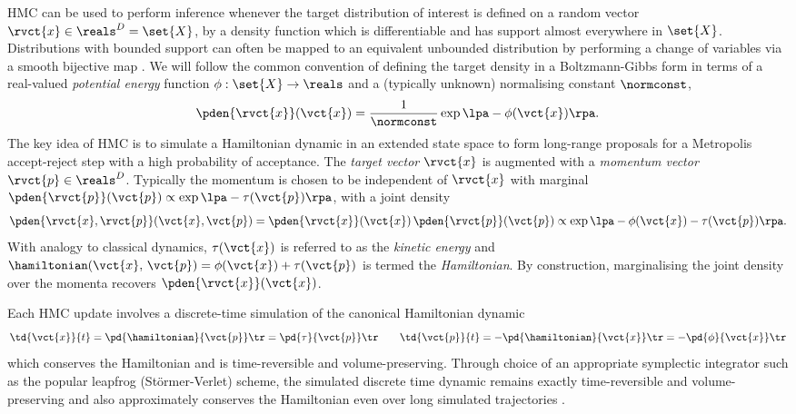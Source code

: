 \ac{HMC} can be used to perform inference whenever the target distribution of interest is defined on a random vector $\rvct{x} \in \reals^D = \set{X}$, by a density function which is differentiable and has support almost everywhere in $\set{X}$. Distributions with bounded support can often be mapped to an equivalent unbounded distribution by performing a change of variables via a smooth bijective map \citep{carpenter2016stan,kucukelbir2016automatic}. We will follow the common convention of defining the target density in a Boltzmann-Gibbs form in terms of a real-valued \emph{potential energy} function $\phi : \set{X} \to \reals$ and a (typically unknown) normalising constant $\normconst$,
\begin{equation}\label{eq:target-density}
  \pden{\rvct{x}}(\vct{x}) = \frac{1}{\normconst}\exp\lpa-\phi(\vct{x})\rpa.
\end{equation}
The key idea of \ac{HMC} is to simulate a Hamiltonian dynamic in an extended state space to form long-range proposals for a Metropolis accept-reject step with a high probability of acceptance. The \emph{target vector} $\rvct{x}$ is augmented with a \emph{momentum vector} $\rvct{p} \in \reals^D$. Typically the momentum is chosen to be independent of $\rvct{x}$ with marginal $\pden{\rvct{p}}(\vct{p}) \propto \exp\lpa -\tau(\vct{p})\rpa$, with a joint density
\begin{equation}\label{eq:hmc-joint-target}
\pden{\rvct{x},\rvct{p}}(\vct{x},\vct{p}) = 
\pden{\rvct{x}}(\vct{x})\,\pden{\rvct{p}}(\vct{p})
\propto 
\exp\lpa -\phi(\vct{x}) - \tau(\vct{p})\rpa.
\end{equation}
With analogy to classical dynamics, $\tau(\vct{x})$ is referred to as the \emph{kinetic energy} and $\hamiltonian(\vct{x},\,\vct{p}) = \phi(\vct{x}) + \tau(\vct{p})$ is termed the \emph{Hamiltonian}. By construction, marginalising the joint density over the momenta recovers $\pden{\rvct{x}}(\vct{x})$.

Each \ac{HMC} update involves a discrete-time simulation of the canonical Hamiltonian dynamic 
\begin{equation}\label{eq:standard-hamiltonian-dynamic}
  \td{\vct{x}}{t} = \pd{\hamiltonian}{\vct{p}}\tr = \pd{\tau}{\vct{p}}\tr 
  \qquad 
  \td{\vct{p}}{t} = -\pd{\hamiltonian}{\vct{x}}\tr = -\pd{\phi}{\vct{x}}\tr
\end{equation}
which conserves the Hamiltonian and is time-reversible and volume-preserving. Through choice of an appropriate symplectic integrator such as the popular leapfrog (St\"ormer-Verlet) scheme, the simulated discrete time dynamic remains exactly time-reversible and volume-preserving and also approximately conserves the Hamiltonian even over long simulated trajectories \citep{leimkuhler2004simulating}.

